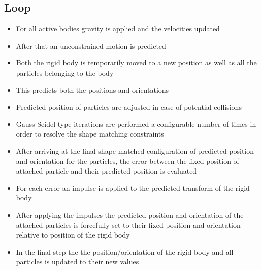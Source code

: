 \subsection{Loop}
\begin{itemize}
\item For all active bodies gravity is applied and the velocities updated
\item After that an unconstrained motion is predicted
\item Both the rigid body is temporarily moved to a new position as well as all the particles belonging to the body
\item This predicts both the positions and orientations
\item Predicted position of particles are adjusted in case of potential collisions
\item Gauss-Seidel type iterations are performed a configurable number of times in order to resolve the shape matching constraints
\item After arriving at the final shape matched configuration of predicted position and orientation for the particles, the error between the fixed position of attached particle and their predicted position is evaluated
\item For each error an impulse is applied to the predicted transform of the rigid body
\item After applying the impulses the predicted position and orientation of the attached particles is forcefully set to their fixed position and orientation relative to position of the rigid body
\item In the final step the the position/orientation of the rigid body and all particles is updated to their new values
\end{itemize}

